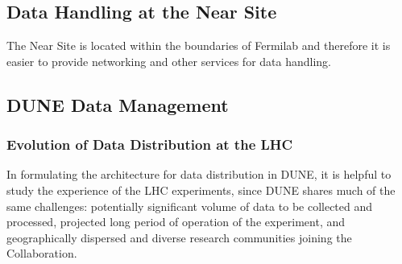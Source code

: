 \subsection{Data Handling at the Near Site}
The Near Site is located within the boundaries of Fermilab and therefore it is easier to provide networking and other services for data handling.

\subsection{DUNE Data Management}
\subsubsection{Evolution of Data Distribution at the LHC}

In formulating the architecture for data distribution in DUNE, it is helpful to study the experience of the LHC experiments,
since DUNE shares much of the same challenges: potentially significant  volume of data to be collected and processed,
projected long period of operation of the experiment, and geographically dispersed and diverse research communities joining the Collaboration.

